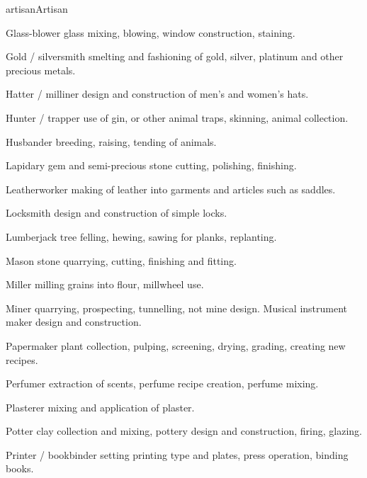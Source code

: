 \begin{Skill}[2.0]{artisan}{Artisan}
\begin{Description}
\item[Glass-blower] glass mixing, blowing, window construction,
  staining.

\item[Gold / silversmith] smelting and fashioning of gold, silver,
  platinum and other precious metals.

\item[Hatter / milliner] design and construction of men’s and women’s
  hats.

\item[Hunter / trapper] use of gin, or other animal traps, skinning,
  animal collection.

\item[Husbander] breeding, raising, tending of animals. 

\item[Lapidary] gem and semi-precious stone cutting, polishing,
  finishing.

\item[Leatherworker] making of leather into garments and articles such
  as saddles.

\item[Locksmith] design and construction of simple locks.

\item[Lumberjack] tree felling, hewing, sawing for planks, replanting.

\item[Mason] stone quarrying, cutting, finishing and fitting.

\item[Miller] milling grains into flour, millwheel use.

\item[Miner] quarrying, prospecting, tunnelling, not mine
  design. Musical instrument maker design and construction.

\item[Papermaker] plant collection, pulping, screening, drying,
  grading, creating new recipes.

\item[Perfumer] extraction of scents, perfume recipe creation, perfume
  mixing.

\item[Plasterer] mixing and application of plaster.

\item[Potter] clay collection and mixing, pottery design and
  construction, firing, glazing.

\item[Printer / bookbinder] setting printing type and plates, press
  operation, binding books.


\end{Description}
\end{Skill}

